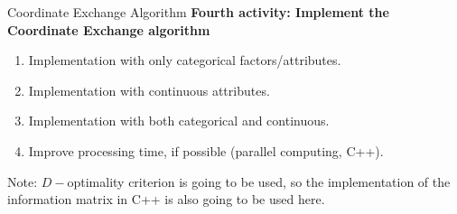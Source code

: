 \documentclass[11pt,t]{beamer}
\begin{document}

\begin{frame}[fragile]{Coordinate Exchange Algorithm}
\textbf{Fourth activity: Implement the Coordinate Exchange algorithm}
\begin{enumerate}
	\item \textcolor{kul-blue}{Implementation with only categorical factors/attributes.}
	\item Implementation with continuous attributes.
	\item Implementation with both categorical and continuous.
	\item Improve processing time, if possible (parallel computing, C++).
\end{enumerate}
\begin{alertblock}{Note:}
	$D-$optimality criterion is going to be used, so the implementation of the information matrix in C++ is also going to be used here.
\end{alertblock}
\end{frame}
\end{document}
